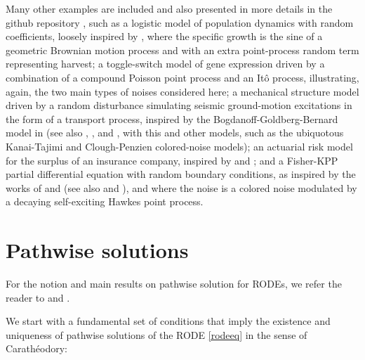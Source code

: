 \documentclass[reqno,12pt]{amsart}
\theoremstyle{plain} %
\theoremstyle{definition} %
\begin{document}
Many other examples are included and also presented in more details in the github repository \cite{RODEConvEM2023}, such as a logistic model of population dynamics with random coefficients, loosely inspired by \cite[Section 15.2]{HanKloeden2017}, where the specific growth is the sine of a geometric Brownian motion process and with an extra point-process random term representing harvest; a toggle-switch model of gene expression driven by a combination of a compound Poisson point process and an It\^o process, illustrating, again, the two main types of noises considered here; a mechanical structure model driven by a random disturbance simulating seismic ground-motion excitations in the form of a transport process, inspired by the Bogdanoff-Goldberg-Bernard model in \cite{BogdanoffGoldbergBernard1961} (see also \cite[Chapter 18]{NeckelRupp2013}, \cite{HousnerJenning1964}, and \cite{Kanai1957}, with this and other models, such as the ubiquotous Kanai-Tajimi and Clough-Penzien colored-noise models); an actuarial risk model for the surplus of an insurance company, inspired by \cite{GerberShiu1998} and \cite{BrigoMercurio2006}; and a Fisher-KPP partial differential equation with random boundary conditions, as inspired by the works of \cite{SalakoShen2020} and \cite{FreidlinWentzell1992} (see also \cite{Fisher1937} and \cite{KPP1937}), and where the noise is a colored noise modulated by a decaying self-exciting Hawkes point process.

\section{Pathwise solutions}
\label{secpathwisesolution}

For the notion and main results on pathwise solution for RODEs, we refer the reader to \cite[Section 2.1]{HanKloeden2017} and \cite[Section 3.3]{NeckelRupp2013}.

We start with a fundamental set of conditions that imply the existence and uniqueness of pathwise solutions of the RODE \eqref{rodeeq} in the sense of Carath\'eodory:
\end{document}
